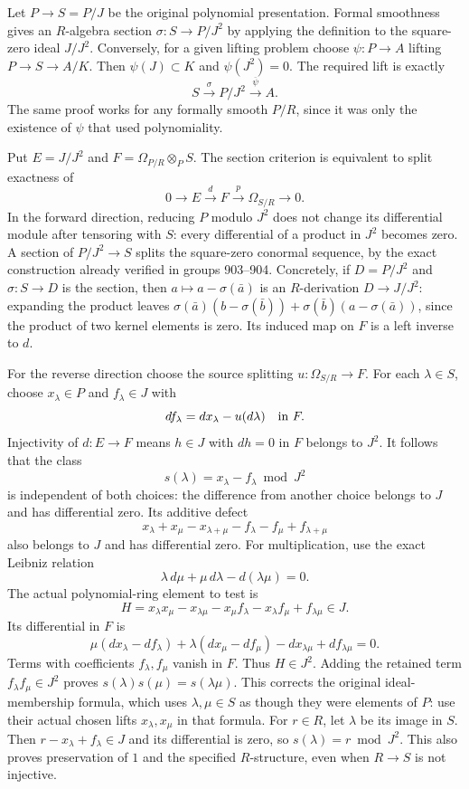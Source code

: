 Let \(P\to S=P/J\) be the original polynomial presentation. Formal smoothness gives an \(R\)-algebra section \(\sigma:S\to P/J^2\) by applying the definition to the square-zero ideal \(J/J^2\). Conversely, for a given lifting problem choose \(\psi:P\to A\) lifting \(P\to S\to A/K\). Then \(\psi(J)\subset K\) and \(\psi(J^2)=0\). The required lift is exactly \[
S\xrightarrow{\sigma}P/J^2\xrightarrow{\overline\psi}A.
\] The same proof works for any formally smooth \(P/R\), since it was only the existence of \(\psi\) that used polynomiality.

Put \(E=J/J^2\) and \(F=\Omega_{P/R}\otimes_PS\). The section criterion is equivalent to split exactness of \[
0\longrightarrow E\xrightarrow{d}F\xrightarrow{p}\Omega_{S/R}\longrightarrow0.
\] In the forward direction, reducing \(P\) modulo \(J^2\) does not change its differential module after tensoring with \(S\): every differential of a product in \(J^2\) becomes zero. A section of \(P/J^2\to S\) splits the square-zero conormal sequence, by the exact construction already verified in groups 903--904. Concretely, if \(D=P/J^2\) and \(\sigma:S\to D\) is the section, then \(a\mapsto a-\sigma(\bar a)\) is an \(R\)-derivation \(D\to J/J^2\): expanding the product leaves \(\sigma(\bar a)(b-\sigma(\bar b))+\sigma(\bar b)(a-\sigma(\bar a))\), since the product of two kernel elements is zero. Its induced map on \(F\) is a left inverse to \(d\).

For the reverse direction choose the source splitting \(u:\Omega_{S/R}\to F\). For each \(\lambda\in S\), choose \(x_\lambda\in P\) and \(f_\lambda\in J\) with \[
df_\lambda=dx_\lambda-u(d\lambda)\quad\hbox{in }F.
\] Injectivity of \(d:E\to F\) means \(h\in J\) with \(dh=0\) in \(F\) belongs to \(J^2\). It follows that the class \[
s(\lambda)=x_\lambda-f_\lambda\bmod J^2
\] is independent of both choices: the difference from another choice belongs to \(J\) and has differential zero. Its additive defect \[
x_\lambda+x_\mu-x_{\lambda+\mu}-f_\lambda-f_\mu+f_{\lambda+\mu}
\] also belongs to \(J\) and has differential zero. For multiplication, use the exact Leibniz relation \[
\lambda\,d\mu+\mu\,d\lambda-d(\lambda\mu)=0.
\] The actual polynomial-ring element to test is \[
H=x_\lambda x_\mu-x_{\lambda\mu}
-x_\mu f_\lambda-x_\lambda f_\mu+f_{\lambda\mu}\in J.
\] Its differential in \(F\) is \[
\mu(dx_\lambda-df_\lambda)+\lambda(dx_\mu-df_\mu)
-dx_{\lambda\mu}+df_{\lambda\mu}=0.
\] Terms with coefficients \(f_\lambda,f_\mu\) vanish in \(F\). Thus \(H\in J^2\). Adding the retained term \(f_\lambda f_\mu\in J^2\) proves \(s(\lambda)s(\mu)=s(\lambda\mu)\). This corrects the original ideal-membership formula, which uses \(\lambda,\mu\in S\) as though they were elements of \(P\): use their actual chosen lifts \(x_\lambda,x_\mu\) in that formula. For \(r\in R\), let \(\lambda\) be its image in \(S\). Then \(r-x_\lambda+f_\lambda\in J\) and its differential is zero, so \(s(\lambda)=r\bmod J^2\). This also proves preservation of \(1\) and the specified \(R\)-structure, even when \(R\to S\) is not injective.

